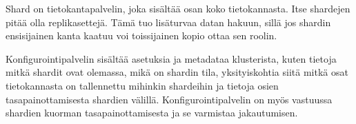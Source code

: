 Shard on tietokantapalvelin, joka sisältää osan koko tietokannasta.
Itse shardejen pitää olla replikasettejä.
Tämä tuo lisäturvaa datan hakuun, sillä jos shardin ensisijainen kanta kaatuu voi toissijainen kopio ottaa sen roolin. 
\medskip



Konfigurointipalvelin sisältää asetuksia ja metadataa klusterista,
kuten tietoja mitkä shardit ovat olemassa, mikä on shardin tila,
yksityiskohtia siitä mitkä osat tietokannasta on tallennettu mihinkin shardeihin
ja tietoja osien tasapainottamisesta shardien välillä.
Konfigurointipalvelin on myös vastuussa shardien kuorman tasapainottamisesta ja se varmistaa jakautumisen.








